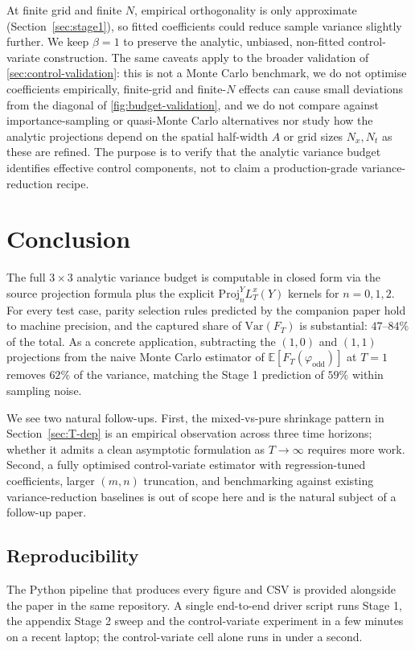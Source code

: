 \documentclass[11pt,reqno]{amsart}
\theoremstyle{plain}
\theoremstyle{definition}
\theoremstyle{remark}
\newcommand{\E}{\mathbb{E}}
\newcommand{\Var}{\mathrm{Var}}
\newcommand{\Proj}{\mathrm{Proj}}
\newcommand{\Loc}{L}
\begin{document}
At finite grid and finite $N$, empirical orthogonality is only
approximate (Section~\ref{sec:stage1}), so fitted coefficients could
reduce sample variance slightly further. We keep $\beta = 1$ to
preserve the analytic, unbiased, non-fitted control-variate
construction. The same caveats apply to the broader validation of
\cref{sec:control-validation}: this is not a Monte Carlo benchmark,
we do not optimise coefficients empirically, finite-grid and
finite-$N$ effects can cause small deviations from the diagonal of
\cref{fig:budget-validation}, and we do not compare against
importance-sampling or quasi-Monte Carlo alternatives nor study how
the analytic projections depend on the spatial half-width $A$ or
grid sizes $N_x, N_t$ as these are refined. The purpose is to verify
that the analytic variance budget identifies effective control
components, not to claim a production-grade variance-reduction
recipe.

\section{Conclusion}
\label{sec:conclusion}

The full $3 \times 3$ analytic variance budget is computable in
closed form via the source projection formula plus the explicit
$\Proj^Y_n \Loc_T^x(Y)$ kernels for $n = 0, 1, 2$. For every test
case, parity selection rules predicted by the companion paper
hold to machine precision, and the captured share of $\Var(F_T)$ is
substantial: $47$--$84\%$ of the total. As a concrete application,
subtracting the $(1, 0)$ and $(1, 1)$ projections from the naive
Monte Carlo estimator of $\E[F_T(\varphi_{\mathrm{odd}})]$ at
$T = 1$ removes $62\%$ of the variance, matching the Stage 1
prediction of $59\%$ within sampling noise.

We see two natural follow-ups. First, the mixed-vs-pure shrinkage
pattern in Section~\ref{sec:T-dep} is an empirical observation
across three time horizons; whether it admits a clean asymptotic
formulation as $T \to \infty$ requires more work. Second, a fully
optimised control-variate estimator with regression-tuned
coefficients, larger $(m, n)$ truncation, and benchmarking against
existing variance-reduction baselines is out of scope here and is
the natural subject of a follow-up paper.

\subsection*{Reproducibility}
The Python pipeline that produces every figure and CSV is provided
alongside the paper in the same repository. A single end-to-end
driver script runs Stage 1, the appendix Stage 2 sweep and the
control-variate experiment in a few minutes on a recent laptop; the
control-variate cell alone runs in under a second.
\end{document}
